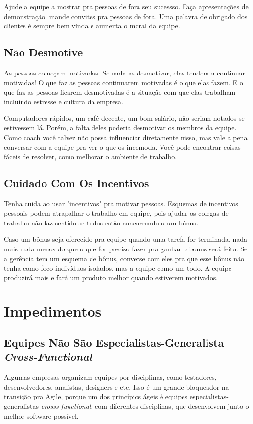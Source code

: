 \documentclass[a4paper, 10pt, font=plain]{abnt}
\begin{document}
Ajude a equipe a mostrar pra pessoas de fora seu sucessso. Faça apresentações de demonstração, mande convites pra pessoas de fora. Uma palavra de obrigado dos clientes é sempre bem vinda e aumenta o moral da equipe.


\subsection{Não Desmotive}
As pessoas começam motivadas. Se nada as desmotivar, elas tendem a continuar motivadas! O que faz as pessoas continuarem motivadas é o que elas fazem. E o que faz as pessoas ficarem desmotivadas é a situação com que elas trabalham - incluindo estresse e cultura da empresa.

Computadores rápidos, um café decente, um bom salário, não seriam notados se estivessem lá. Porém, a falta deles poderia desmotivar os membros da equipe. Como coach você talvez não possa influenciar diretamente nisso, mas vale a pena conversar com a equipe pra ver o que os incomoda. Você pode encontrar coisas fáceis de resolver, como melhorar o ambiente de trabalho.


\subsection{Cuidado Com Os Incentivos}
Tenha cuida ao usar "incentivos" pra motivar pessoas. Esquemas de incentivos pessoais podem atrapalhar o trabalho em equipe, pois ajudar os colegas de trabalho não faz sentido se todos estão concorrendo a um bônus.

Caso um bônus seja oferecido pra equipe quando uma tarefa for terminada, nada mais nada menos do que o que for preciso fazer pra ganhar o bonus será feito. Se a gerência tem um esquema de bônus, converse com eles pra que esse bônus não tenha como foco indivíduos isolados, mas a equipe como um todo. A equipe produzirá mais e fará um produto melhor quando estiverem motivados.



\section{Impedimentos}

\subsection{Equipes Não São Especialistas-Generalista \textit{Cross-Functional}}
Algumas empresas organizam equipes por disciplinas, como testadores, desenvolvedores, analistas, designers e etc. Isso é um grande bloqueador na transição pra Agile, porque um dos princípios ágeis é equipes especialistas-generalistas \textit{crosss-functional}, com diferentes disciplinas, que desenvolvem junto o melhor software possível.
\end{document}
